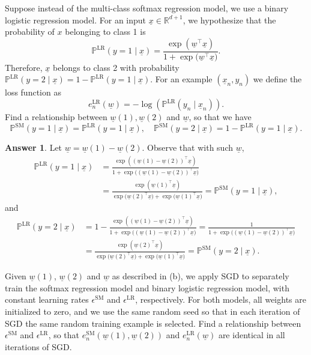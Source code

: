 \documentclass{article}
\newcommand{\probP}{\mathds{P}}
\theoremstyle{definition}
\newtheorem*{answer}{Answer}
\begin{document}
\begin{question}[start=0]
\begin{question}
		\item \label{SMtoLR}Suppose instead of the multi-class softmax regression model, we use a binary logistic regression model. For an input $\underline{x} \in \mathbb{R}^{d+1}$, we hypothesize that the probability of $x$ belonging to class 1 is
		\[
		\probP^{\text{LR}}(y = 1\mid \underline{x}) = \frac{\exp({\underline{w}^\top \underline{x}})}{1 + \exp{(\underline{w}^\top \underline{x}})}.
		\]
		Therefore, $\underline{x}$ belongs to class 2 with probability $\probP^{\text{LR}}(y = 2\mid \underline{x}) = 1 - \probP^{\text{LR}}(y = 1\mid \underline{x})$. For an example $(\underline{x}_n, y_n)$ we define the loss function as
		\[
		e^{\text{LR}}_{n}(\underline{w}) = -\log(\probP^{\text{LR}}(y_n\mid \underline{x}_n)).
		\]
		Find a relationship between $\underline{w}(1), \underline{w}(2)$ and $\underline{w}$, so that we have
		\[
		\probP^{\text{SM}}(y = 1\mid \underline{x}) = \probP^{\text{LR}}(y = 1\mid \underline{x}), \quad \probP^{\text{SM}}(y = 2\mid \underline{x}) = 1 - \probP^{\text{LR}}(y = 1\mid \underline{x}).
		\]
		\begin{answer}
			Let $\underline{w} = \underline{w}(1) - \underline{w}(2)$. Observe that with such $\underline{w}$,
			\begin{align*}
				\probP^{\text{LR}}(y = 1\mid \underline{x}) &= \frac{\exp({\left(\underline{w}(1) - \underline{w}(2)\right)^\top \underline{x}})}{1 + \exp{(\left(\underline{w}(1) - \underline{w}(2)\right)^\top \underline{x}})}\\
				&= \frac{\exp({\underline{w}(1)^\top \underline{x}})}{\exp{(\underline{w}(2)^\top \underline{x}}) + \exp{(\underline{w}(1)^\top \underline{x}})} = \probP^{\text{SM}}(y = 1\mid \underline{x}),
			\end{align*}
			and 
			\begin{align*}
				\probP^{\text{LR}}(y = 2\mid \underline{x}) &= 1 - \frac{\exp({\left(\underline{w}(1) - \underline{w}(2)\right)^\top \underline{x}})}{1 + \exp{(\left(\underline{w}(1) - \underline{w}(2)\right)^\top \underline{x}})} = \frac{1}{1 + \exp{(\left(\underline{w}(1) - \underline{w}(2)\right)^\top \underline{x}})}\\
				&= \frac{\exp({\underline{w}(2)^\top \underline{x}})}{\exp{(\underline{w}(2)^\top \underline{x}}) + \exp{(\underline{w}(1)^\top \underline{x}})} = \probP^{\text{SM}}(y = 2\mid \underline{x}).
			\end{align*}
		\end{answer}
		\item Given $\underline{w}(1)$, $\underline{w}(2)$ and $\underline{w}$ as described in (b), we apply SGD to separately train the softmax regression model and binary logistic regression model, with constant learning rates $\epsilon^{\text{SM}}$ and $\epsilon^{\text{LR}}$, respectively. For both models, all weights are initialized to zero, and we use the same random seed so that in each iteration of SGD the same random training example is selected. Find a relationship between $\epsilon^{\text{SM}}$ and $\epsilon^{\text{LR}}$, so that $e^{\text{SM}}_{n}(\underline{w}(1), \underline{w}(2))$ and $e^{\text{LR}}_{n}(\underline{w})$ are identical in all iterations of SGD.

\end{question}
\end{question}
\end{document}
